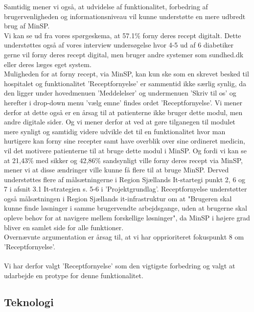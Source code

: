 Samtidig mener vi også, at udvidelse af funktionalitet, forbedring af brugervenligheden og informationsniveau vil kunne understøtte en mere udbredt brug af MinSP.\\
Vi kan se ud fra vores spørgeskema, at 57.1\% forny deres recept digitalt. Dette understøttes også af vores interview undersøgelse hvor 4-5 ud af 6 diabetiker gerne vil forny deres recept digital, men bruger andre systemer som sundhed.dk eller deres læges eget system.\\
Muligheden for at forny recept, via MinSP, kan kun ske som en skrevet besked til hospitalet og funktionalitet 'Receptfornyelse' er sammentid ikke særlig synlig, da den ligger under hovedmenuen 'Meddelelser' og undermenuen 'Skriv til os' og herefter i drop-down menu 'vælg emne' findes ordet 'Receptfornyelse'. Vi mener derfor at dette også er en årsag til at patienterne ikke bruger dette modul, men andre digitale sider. Og vi mener derfor at ved at gøre tilganegen til modulet mere synligt og samtidig videre udvikle det til en funktionalitet hvor man hurtigere kan forny sine recepter samt have overblik over sine ordineret medicin, vil det motivere patienterne til at bruge dette modul i MinSP. Og fordi vi kan se at 21,43\% med sikker og 42,86\% sandsynligt ville forny deres recept via MinSP, mener vi at disse ændringer ville kunne få flere til at bruge MinSP. Derved understøttes flere af målsætningerne i Region Sjællands It-startegi punkt 2, 6 og 7 i afsnit 3.1 It-strategien s. 5-6 i 'Projektgrundlag'. Receptfornyelse understøtter også målsætningen i Region Sjællands it-infrastruktur om at "Brugeren skal kunne finde løsninger i samme brugervendte arbejdsgange, uden at brugerne skal opleve behov for at navigere mellem forskellige løsninger", da MinSP i højere grad bliver en samlet side for alle funktioner. \\ 
Overnævnte argumentation er årsag til, at vi har opprioriteret fokuspunkt 8 om 'Receptfornyelse'. 
\\\\
Vi har derfor valgt 'Receptfornyelse' som den vigtigste forbedring og valgt at udarbejde en protype for denne funktionalitet. 
\subsection{Teknologi}
%
%
